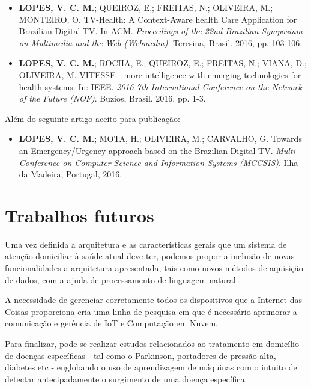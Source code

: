 \begin{itemize}
  \item \textbf{LOPES, V. C. M.}; QUEIROZ, E.; FREITAS, N.; OLIVEIRA, M.; MONTEIRO, O. TV-Health:
  A Context-Aware health Care Application for Brazilian Digital TV. In ACM.
  \textit{Proceedings of the 22nd Brazilian Symposium on Multimedia and the Web (Webmedia)}. 
  Teresina, Brasil. 2016, pp. 103-106.

  \item \textbf{LOPES, V. C. M.}; ROCHA, E.; QUEIROZ, E.; FREITAS, N.; VIANA, D.; OLIVEIRA, M. VITESSE 
  - more intelligence with emerging technologies for health systems. In: IEEE. 
  \textit{2016 7th International Conference on the Network of the Future (NOF)}. Buzios, Brasil. 2016, pp. 1-3.
\end{itemize}

Além do seguinte artigo aceito para publicação:

\begin{itemize}
  \item \textbf{LOPES, V. C. M.}; MOTA, H.; OLIVEIRA, M.; CARVALHO, G. Towards an Emergency/Urgency
    approach based on the Brazilian Digital TV. \textit{Multi Conference on Computer Science 
    and Information Systems (MCCSIS)}. Ilha da Madeira, Portugal, 2016.
\end{itemize}

\section{Trabalhos futuros} \label{sec:trabalhos-futuros}

Uma vez definida a arquitetura e as características gerais que um sistema de
atenção domiciliar à saúde atual deve ter, podemos propor a inclusão de
novas funcionalidades a arquitetura apresentada, tais como novos métodos
de aquisição de dados, com a ajuda de processamento de linguagem natural.

A necessidade de gerenciar corretamente todos os dispositivos que a Internet
das Coisas proporciona cria uma linha de pesquisa em que é necessário aprimorar
a comunicação e gerência de IoT e Computação em Nuvem.

Para finalizar, pode-se realizar estudos relacionados ao tratamento em domicílio de
doenças específicas - tal como o Parkinson, portadores de pressão alta,
diabetes etc - englobando o uso de aprendizagem de máquinas com o intuito de detectar
antecipadamente o surgimento de uma doença específica.
